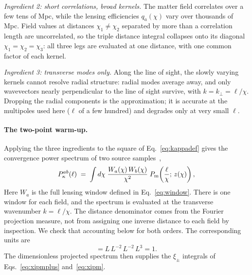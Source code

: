 \documentclass[11pt]{article}
\numberwithin{equation}{section}
\begin{document}
\emph{Ingredient 2: short correlations, broad kernels.}  The matter
field correlates over a few tens of Mpc, while the lensing
efficiencies $q_a(\chi)$ vary over thousands of Mpc.  Field values
at distances $\chi_1 \neq \chi_2$ separated by more than a
correlation length are uncorrelated, so the triple distance integral
collapses onto its diagonal $\chi_1 = \chi_2 = \chi_3$: all three
legs are evaluated at one distance, with one common factor of each
kernel.

\emph{Ingredient 3: transverse modes only.}  Along the line of
sight, the slowly varying kernels cannot resolve radial structure:
radial modes average away, and only wavevectors nearly perpendicular
to the line of sight survive, with $k = k_\perp = \ell/\chi$.
Dropping the radial components is the approximation; it is accurate
at the multipoles used here ($\ell$ of a few hundred) and degrades
only at very small $\ell$.

\paragraph{The two-point warm-up.}
Applying the three ingredients to the square of
Eq.~\eqref{eq:kappadef} gives the convergence power spectrum of two
source samples~\cite{GomesTATT},
\begin{equation}
  P^{ab}_\kappa(\ell)
  \;=\;
  \int d\chi\;
  \frac{W_a(\chi)\, W_b(\chi)}{\chi^2}\;
  P_{\rm m}\!\left(\frac{\ell}{\chi};\, z(\chi)\right),
  \label{eq:limber2pt}
\end{equation}
Here $W_a$ is the full lensing window defined in
Eq.~\eqref{eq:window}. There is one window for each field, and the
spectrum is evaluated at the transverse wavenumber $k=\ell/\chi$.
The distance denominator comes from the Fourier projection measure,
not from assigning one inverse distance to each field by inspection.
We check that accounting below for both orders. The corresponding units
are
\begin{equation}
 [d\chi\,W_aW_b\,\chi^{-2}P_{\rm m}]
 =L\,L^{-2}\,L^{-2}\,L^3=1.
\end{equation}
The dimensionless projected spectrum then supplies the $\xi_\pm$
integrals of Eqs.~\eqref{eq:xipmplus} and~\eqref{eq:xipm}.
\end{document}
